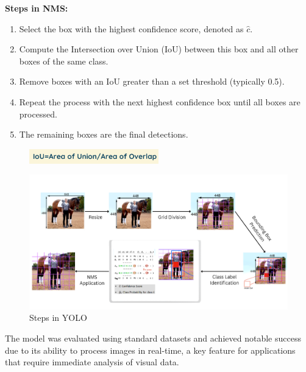\begin{enumerate}
  \textbf{Steps in NMS:}
  \begin{enumerate}
    \item Select the box with the highest confidence score, denoted as $\hat{c}$.
    \item Compute the Intersection over Union (IoU) between this box and all other boxes of the same class.
    \item Remove boxes with an IoU greater than a set threshold (typically 0.5).
    \item Repeat the process with the next highest confidence box until all boxes are processed.
    \item The remaining boxes are the final detections.
  \end{enumerate}
\end{enumerate}
%
\begin{figure}[h!]
    \centering
    \includegraphics[width=0.5\textwidth]{images/IoU.png}
\end{figure}
%
\begin{figure}[h!]
    \centering
    \includegraphics[width=1\textwidth]{images/Yolo Steps.png}
    \caption{Steps in YOLO}
\end{figure}
%
The model was evaluated using standard datasets and achieved notable success due to its ability to process images in real-time, a key feature for applications that require immediate analysis of visual data.\\\\
